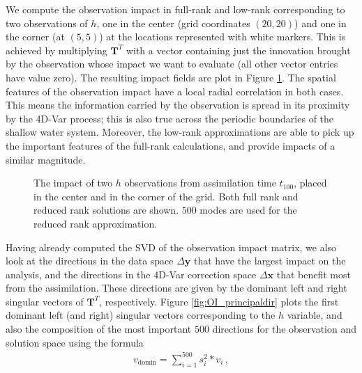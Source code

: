 \documentclass[final,sort&compress]{elsarticle}
\newcommand{\T}{\mathbf{T}}
\newcommand{\x}{   \mathbf{x} }
\newcommand{\y}{ \mathbf{y} }
\begin{document}
We compute the observation impact in full-rank and low-rank corresponding to two observations of $h$,
one in the center (grid coordinates $(20,20)$) and one in the corner (at $(5,5)$) at the locations represented with white markers.
This is achieved  by multiplying $\T^T$ with a vector containing just the innovation brought 
by the observation whose impact we want to evaluate (all other vector entries have value zero).
The resulting impact fields are plot in Figure \ref{fig:OI_forwardobsimp}.
The spatial features of the observation impact have a local radial correlation in both cases.
This means the information carried by the observation is spread in its proximity by the 4D-Var process;
this is also true across the periodic boundaries of the shallow water system.
Moreover, the low-rank approximations are able to pick up the important features of the full-rank calculations,
and provide impacts of a similar magnitude.
\begin{figure}
 \setcounter{subfigure}{0}
  \centering
  \caption{The impact of two $h$ observations from assimilation time $t_100$, placed in the center and in the corner of the grid.
  Both full rank and reduced rank solutions are shown. $500$ modes are used for the reduced rank approximation.}
  \label{fig:OI_forwardobsimp}
 \end{figure}

Having already computed the SVD of the observation impact matrix, we also look
at the directions in the data space $\Delta \y$ that have the largest impact on the analysis, and the directions in the 4D-Var correction space $\Delta \x$
that benefit most from the assimilation. These directions are
given by the dominant left and right singular vectors of $\T^T$, respectively.
Figure \ref{fig:OI_principaldir} plots the first dominant left (and right) singular vectors
corresponding to the $h$ variable, and also the composition of the most important $500$ 
directions for the observation and solution space using the formula
\begin{align}
 v_\textrm{domin} = \sum\limits_{i=1}^{500} s_i^2 * v_i\,,
\end{align}
\end{document}
